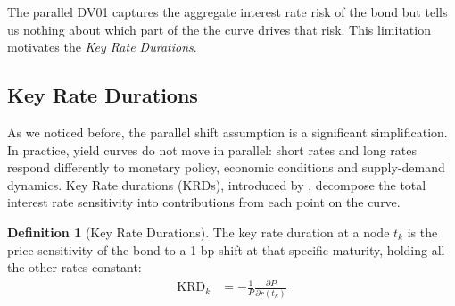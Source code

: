 \documentclass{article}
\theoremstyle{definition}  %
\newtheorem{definition}{Definition}[section]
\theoremstyle{plain}  %
\numberwithin{definition}{section}
\numberwithin{proposition}{section}
\numberwithin{theorem}{section}
\numberwithin{equation}{section}
\begin{document}
The parallel DV01 captures the aggregate interest rate risk of the bond but tells us nothing about which part of the the curve drives that risk. This limitation motivates the \textit{Key Rate Durations}.

\subsection{Key Rate Durations}

As we noticed before, the parallel shift assumption is a significant simplification. In practice, yield curves do not move in parallel: short rates and long rates respond differently to monetary policy, economic conditions and supply-demand dynamics. Key Rate durations (KRDs), introduced by \cite{ho1992key}, decompose the total interest rate sensitivity into contributions from each point on the curve.
\begin{definition}[Key Rate Durations]
    The key rate duration at a node $t_{k}$ is the price sensitivity of the bond to a 1 bp shift at that specific maturity, holding all the other rates constant:
    \begin{align*}
        \text{KRD}_{k} &= -\frac{1}{P} \frac{\partial P}{\partial r(t_{k})}
    \end{align*}
\end{definition}
\end{document}
